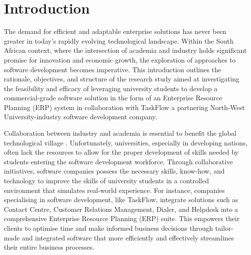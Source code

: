 \chapter{Introduction}
\par{The demand for efficient and adaptable enterprise solutions has never been greater in today's
rapidly evolving technological landscape. Within the South African context, where the
intersection of academia and industry holds significant promise for innovation and economic
growth, the exploration of approaches to software development becomes imperative. This
introduction outlines the rationale, objectives, and structure of the research study aimed at
investigating the feasibility and efficacy of leveraging university students to develop a
commercial-grade software solution in the form of an Enterprise Resource Planning (ERP)
system in collaboration with TaskFlow a partnering North-West University-industry software
development company.}

\par{Collaboration between industry and academia is essential to benefit the global technological
village \citep{baig2018bridging}. Unfortunately, universities, especially in developing nations, 
often lack the resources to allow for the proper development of skills needed by students entering the software development workforce. Through collaborative initiatives, software companies possess
the necessary skills, know-how, and technology to improve the skills of university students in a
controlled environment that simulates real-world experience. For instance, companies
specialising in software development, like TaskFlow, integrate solutions such as Contact Centre,
Customer Relations Management, Dialer, and Helpdesk into a comprehensive Enterprise
Resource Planning (ERP) suite. This empowers their clients to optimise time and make
informed business decisions through tailor-made and integrated software that more efficiently
and effectively streamlines their entire business processes.}

